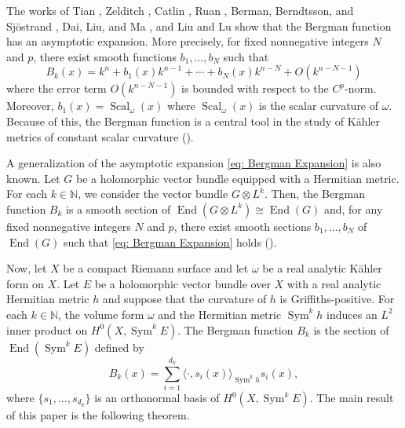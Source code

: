 \documentclass{amsart}
\theoremstyle{definition}
\theoremstyle{remark}
\numberwithin{equation}{section}
\DeclareMathOperator{\Sym}{Sym}
\DeclareMathOperator{\End}{End}
\DeclareMathOperator{\Scal}{Scal}
\begin{document}
The works of Tian \cite{Tian}, Zelditch \cite{Z}, Catlin \cite{Cat}, Ruan \cite{R}, Berman, Berndtsson, and Sj\"ostrand \cite{BBS}, Dai, Liu, and Ma \cite{DLM}, and Liu and Lu \cite{LL} show that the Bergman function has an asymptotic expansion. More precisely, for fixed nonnegative integers $N$ and $p$, there exist smooth functions $b_{1}, \dotsc, b_{N}$ such that 
\begin{equation} \label{eq: Bergman Expansion}
B_k(x) = k^n + b_{1}(x) k^{n-1} + \dotsb + b_{N}(x) k^{n-N} + O(k^{n-N-1}) 
\end{equation}
where the error term $O(k^{n-N-1})$ is bounded with respect to the $C^p$-norm. Moreover, $b_1(x) = \Scal_\omega(x)$ where $\Scal_\omega(x)$ is the scalar curvature of $\omega$. Because of this, the Bergman function is a central tool in the study of K\"ahler metrics of constant scalar curvature (\cite{Don, Yau}).

A generalization of the asymptotic expansion \eqref{eq: Bergman Expansion} is also known. Let $G$ be a holomorphic vector bundle equipped with a Hermitian metric. For each $k \in \mathbb{N}$, we consider the vector bundle $G \otimes L^k$. Then, the Bergman function $B_k$ is a smooth section of $\End(G \otimes L^k) \cong \End(G)$ and, for any fixed nonnegative integers $N$ and $p$, there exist smooth sections $b_{1}, \dotsc, b_{N}$ of $\End(G)$ such that \eqref{eq: Bergman Expansion} holds (\cite{BBS, Cat, DLM, LL}).



Now, let $X$ be a compact Riemann surface and let $\omega$ be a real analytic K\"ahler form on $X$. Let $E$ be a holomorphic vector bundle over $X$ with a real analytic Hermitian metric $h$ and suppose that the curvature of $h$ is Griffiths-positive. For each $k \in \mathbb{N}$, the volume form $\omega$ and the Hermitian metric $\Sym^k h$ induces an $L^2$ inner product on $H^0(X,\Sym^k E)$. The Bergman function $B_k$ is the section of $\End(\Sym^k E)$ defined by
$$
B_k(x) = \sum_{i=1}^{d_k} \langle \cdot, s_i(x) \rangle_{\Sym^k h} s_i(x),
$$
where $\{s_1, \dotsc, s_{d_k}\}$ is an orthonormal basis of $H^0(X, \Sym^kE)$. The main result of this paper is the following theorem.
\end{document}
